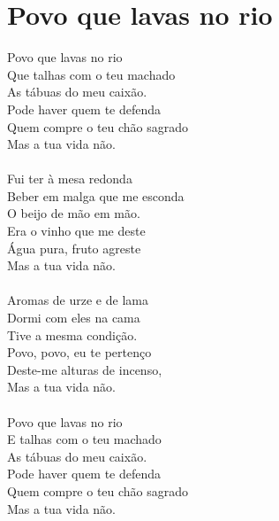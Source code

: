 \documentclass{article}
\begin{document}
\section{ Povo que lavas no rio}
Povo que lavas no rio\\
Que talhas com o teu machado\\
As tábuas do meu caixão.\\
Pode haver quem te defenda\\
Quem compre o teu chão sagrado\\
Mas a tua vida não.\\
\\
Fui ter à mesa redonda\\
Beber em malga que me esconda\\
O beijo de mão em mão.\\
Era o vinho que me deste\\
Água pura, fruto agreste\\
Mas a tua vida não.\\
\\
Aromas de urze e de lama\\
Dormi com eles na cama\\
Tive a mesma condição.\\
Povo, povo, eu te pertenço\\
Deste-me alturas de incenso,\\
Mas a tua vida não.\\
\\
Povo que lavas no rio\\
E talhas com o teu machado\\
As tábuas do meu caixão.\\
Pode haver quem te defenda\\
Quem compre o teu chão sagrado\\
Mas a tua vida não.\\
\end{document}
